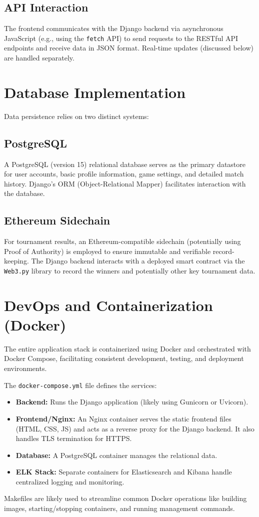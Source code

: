 \subsection{API Interaction}
The frontend communicates with the Django backend via asynchronous JavaScript (e.g., using the \texttt{fetch} API) to send requests to the RESTful API endpoints and receive data in JSON format. Real-time updates (discussed below) are handled separately.

\section{Database Implementation}
\label{sec:database_impl}
Data persistence relies on two distinct systems:

\subsection{PostgreSQL}
A PostgreSQL (version 15) relational database serves as the primary datastore for user accounts, basic profile information, game settings, and detailed match history. Django's ORM (Object-Relational Mapper) facilitates interaction with the database.

\subsection{Ethereum Sidechain}
For tournament results, an Ethereum-compatible sidechain (potentially using Proof of Authority) is employed to ensure immutable and verifiable record-keeping. The Django backend interacts with a deployed smart contract via the \texttt{Web3.py} library to record the winners and potentially other key tournament data.


\section{DevOps and Containerization (Docker)}
\label{sec:devops_impl}
The entire application stack is containerized using Docker and orchestrated with Docker Compose, facilitating consistent development, testing, and deployment environments.

The \texttt{docker-compose.yml} file defines the services:
\begin{itemize}
    \item \textbf{Backend:} Runs the Django application (likely using Gunicorn or Uvicorn).
    \item \textbf{Frontend/Nginx:} An Nginx container serves the static frontend files (HTML, CSS, JS) and acts as a reverse proxy for the Django backend. It also handles TLS termination for HTTPS.
    \item \textbf{Database:} A PostgreSQL container manages the relational data.
    \item \textbf{ELK Stack:} Separate containers for Elasticsearch and Kibana handle centralized logging and monitoring.
\end{itemize}
Makefiles are likely used to streamline common Docker operations like building images, starting/stopping containers, and running management commands.